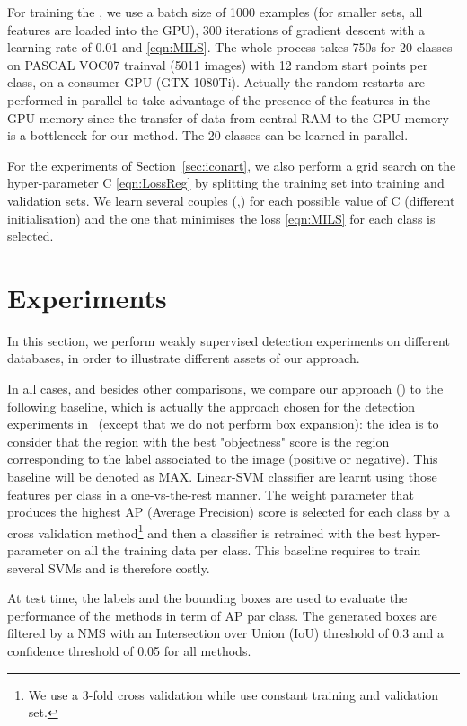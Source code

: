 \documentclass[runningheads]{llncs}
\newcommand\MAX{MAX}
\begin{document}
 For training the \MIL{}, we use a batch size of 1000 examples (for smaller sets, all features are loaded into the GPU), 300 iterations of gradient descent with a learning rate of 0.01 and   \eqref{eqn:MILS}. The whole process takes 750s for 20 classes on PASCAL VOC07 trainval (5011 images) with 12 random start points per class, on a consumer GPU (GTX 1080Ti). Actually the random restarts are performed in parallel to take advantage of the presence of the features in the GPU memory since the transfer of data from central RAM to the GPU memory is a bottleneck for our method. The 20 classes can be learned in parallel. 
 
 For the experiments of Section~\ref{sec:iconart}, we also perform a grid search on the hyper-parameter C \eqref{eqn:LossReg} by splitting the training set into training and validation sets. We learn several couples (,) for each possible value of C (different initialisation) and the one that minimises the loss \eqref{eqn:MILS} for each class is selected. 
 


\section{Experiments}
\label{sec:experiments}

In this section, we perform weakly supervised detection experiments on different databases, in order to illustrate different assets of our approach. 

In all cases, and besides other comparisons, we compare our approach (\MIL{}) to the following baseline, which is actually the approach chosen for the detection experiments in~\cite{crowley_art_2016} (except that we do not perform box expansion): the idea is to consider that the region with the best "objectness" score is the region corresponding to the label associated to the image (positive or negative). This baseline will be denoted as \MAX{}. Linear-SVM classifier are learnt using those features per class in a one-vs-the-rest manner. The weight parameter that produces the highest AP (Average Precision) score is selected for each class by a cross validation method\footnote{We use a 3-fold cross validation while \cite{crowley_art_2016} use constant training and validation set.} and then a classifier is retrained with the best hyper-parameter on all the training data per class. This baseline requires to train several SVMs and is therefore costly.

At test time, the labels and the bounding boxes are used to evaluate the performance of the methods in term of AP par class. The generated boxes are filtered by a NMS with an Intersection over Union (IoU) \cite{everingham_pascal_2007} threshold of 0.3 and a confidence threshold of 0.05 for all methods.
\end{document}
